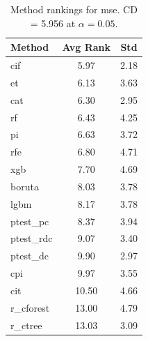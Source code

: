 \begin{table}[h]
\centering
\caption{Method rankings for mse. CD = 5.956 at $\alpha=0.05$.}
\label{tab:ranks_mse}
\begin{tabular}{lcc}
\toprule
Method & Avg Rank & Std \\
\midrule
cif & 5.97 & 2.18 \\
et & 6.13 & 3.63 \\
cat & 6.30 & 2.95 \\
rf & 6.43 & 4.25 \\
pi & 6.63 & 3.72 \\
rfe & 6.80 & 4.71 \\
xgb & 7.70 & 4.69 \\
boruta & 8.03 & 3.78 \\
lgbm & 8.17 & 3.78 \\
ptest_pc & 8.37 & 3.94 \\
ptest_rdc & 9.07 & 3.40 \\
ptest_dc & 9.90 & 2.97 \\
cpi & 9.97 & 3.55 \\
cit & 10.50 & 4.66 \\
r_cforest & 13.00 & 4.79 \\
r_ctree & 13.03 & 3.09 \\
\bottomrule
\end{tabular}
\end{table}